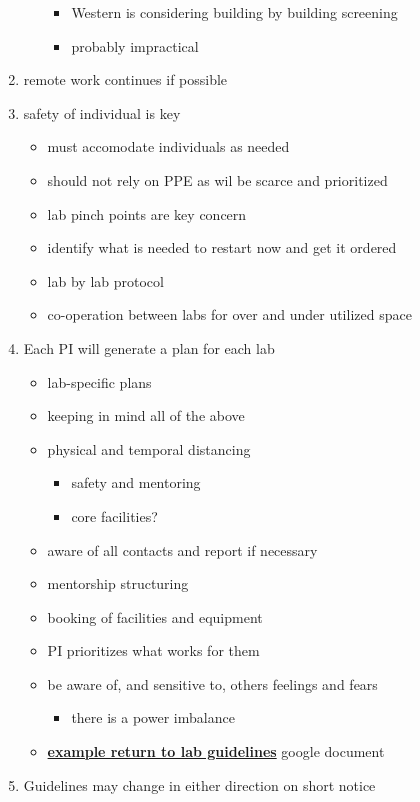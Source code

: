 \documentclass[onecolumn]{article}
\providecommand{\tightlist}{%
  \setlength{\itemsep}{0pt}\setlength{\parskip}{0pt}}
\begin{document}
\begin{enumerate}
\begin{itemize}
    \begin{itemize}
    \item
      Western is considering building by building screening
    \item
      probably impractical
    \end{itemize}
  \end{itemize}
\item
  remote work continues if possible
\item
  safety of individual is key

  \begin{itemize}
  \item
    must accomodate individuals as needed
  \item
    should not rely on PPE as wil be scarce and prioritized
  \item
    lab pinch points are key concern
  \item
    identify what is needed to restart now and get it ordered
  \item
    lab by lab protocol
  \item
    co-operation between labs for over and under utilized space
  \end{itemize}
\item
  Each PI will generate a plan for each lab

  \begin{itemize}
  \item
    lab-specific plans
  \item
    keeping in mind all of the above
  \item
    physical and temporal distancing

    \begin{itemize}
    \item
      safety and mentoring
    \item
      core facilities?
    \end{itemize}
  \item
    aware of all contacts and report if necessary
  \item
    mentorship structuring
  \item
    booking of facilities and equipment
  \item
    PI prioritizes what works for them
  \item
    be aware of, and sensitive to, others feelings and fears

    \begin{itemize}
    \tightlist
    \item
      there is a power imbalance
    \end{itemize}
  \item
    \textbf{\href{https://docs.google.com/spreadsheets/d/1uwgvRFWeSh9VgWA8hBuEy0JOsIGv9IwexI6_6w3-lIs/edit\#gid=0}{example
    return to lab guidelines}} google document
  \end{itemize}
\item
  Guidelines may change in either direction on short notice


\end{enumerate}
\end{document}
